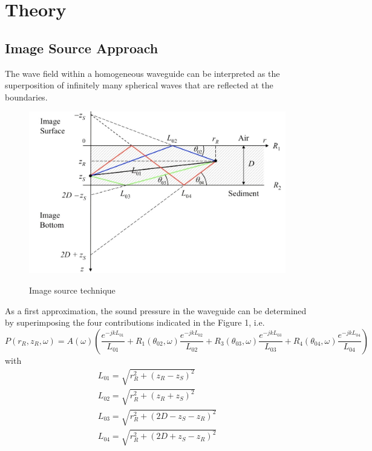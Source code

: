 \chapter*{Theory} 

\section{ Image Source Approach } \label{ Image Source Approach }
\noindent The wave field within a homogeneous waveguide can be interpreted as the superposition of infinitely many spherical waves that are reflected at the boundaries.
\begin{figure}[H]
\centering
{\includegraphics[scale=0.35]{usp1.jpg}}
\caption{ Image source technique }
\end{figure}
\noindent  As a first approximation, the sound pressure in the waveguide can be determined by superimposing the four contributions indicated in the Figure 1, i.e.
\begin{equation}
\textit{$P(r_R, z_R,\omega)$} = A(\omega)( \frac{e^{-jkL_{01}}}{L_{01}} + R_{1}(\theta_{02},\omega) \frac{e^{-jkL_{02}}}{L_{02}} +  R_{3}(\theta_{03},\omega) \frac{e^{-jkL_{03}}}{L_{03}} +  R_{4}(\theta_{04},\omega) \frac{e^{-jkL_{04}}}{L_{04}} )
\end{equation}
\noindent with
\begin{equation}
\begin{gathered} 
L_{01}  = \sqrt{r_{R}^{2} + ( z_{R} - z_{S})^{2}} \\
L_{02}  = \sqrt{r_{R}^{2} + ( z_{R} + z_{S})^{2}} \\
L_{03}  = \sqrt{r_{R}^{2} + (2D - z_{S} - z_{R})^{2}} \\
L_{04}  = \sqrt{r_{R}^{2} + (2D + z_{S} - z_{R})^{2}}
\end{gathered} 
\end{equation}
